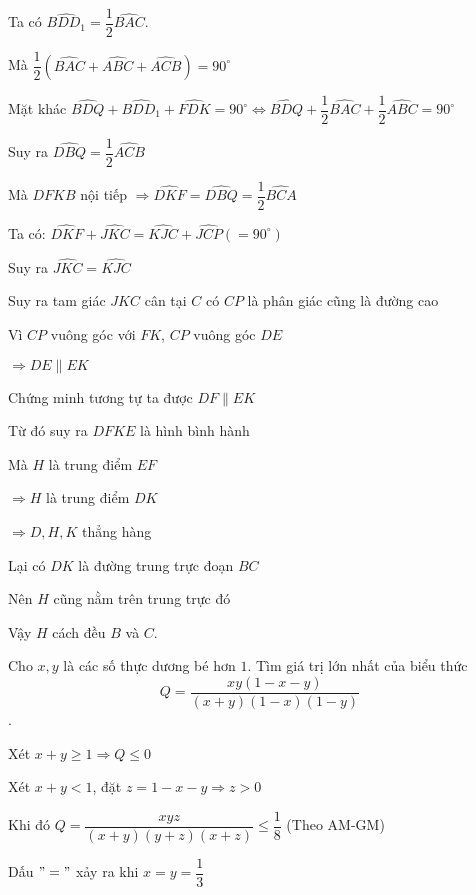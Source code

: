 \begin{ex}
{		Ta có $\widehat{BDD_1}=\dfrac{1}{2}\widehat{BAC}$.
		
		Mà $\dfrac{1}{2}(\widehat{BAC} +\widehat{ABC}+\widehat{ACB})=90^\circ$
		
		Mặt khác $\widehat{BDQ}+\widehat{BDD_1}+\widehat{FDK}=90^\circ \Leftrightarrow \widehat{BDQ}+\dfrac{1}{2}	\widehat{BAC} + \dfrac{1}{2} \widehat{ABC}=90^\circ$
		
		Suy ra $\widehat{DBQ}=\dfrac{1}{2}\widehat{ACB}$
		
		Mà $DFKB$ nội tiếp $\Rightarrow \widehat{DKF}=\widehat{DBQ}=\dfrac{1}{2} \widehat{BCA}$
		
		Ta có: $\widehat{DKF}+\widehat{JKC}=\widehat{KJC}+\widehat{JCP}  (=90^\circ)$
		
		Suy ra  $\widehat{JKC}=\widehat{KJC}$
		
		Suy ra tam giác $JKC$ cân tại $C$ có $CP$ là phân giác cũng là đường cao
		
	Vì $CP$ vuông góc với $FK$,  $CP$ vuông góc $DE$ 
	
	$\Rightarrow DE \parallel EK$
	
	Chứng minh tương tự  ta được $DF \parallel EK$ 
	
	Từ đó suy ra $DFKE$ là hình bình hành 
	
Mà $H$ là trung điểm $EF$

$\Rightarrow H$ là trung điểm $DK$


$\Rightarrow D, H, K$ thẳng hàng

Lại có $DK$ là đường trung trực đoạn $BC$ 

Nên $H$ cũng nằm trên trung trực đó

Vậy $H$ cách đều $B$ và $C$.

	}
\end{ex}

\begin{ex}%
Cho $x,y$ là các số thực dương bé hơn $1$. Tìm giá trị lớn nhất của biểu thức
 $$Q=\dfrac{xy(1-x-y)}{(x+y)(1-x)(1-y)}$$.
\loigiai
{
	Xét $x+y\geq 1 \Rightarrow Q\leq 0$
	
	Xét $x+y<1$, đặt	$z=1-x-y \Rightarrow z>0$
	
Khi đó $Q=\dfrac{xyz}{(x+y)(y+z)(x+z)} \leq \dfrac{1}{8}$ (Theo AM-GM)

Dấu $"="$ xảy ra khi $x=y=\dfrac{1}{3}$
}
\end{ex}
